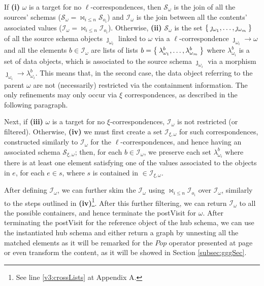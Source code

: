 \begin{example}[continues=ex:examplegraphdata,label=ex:examplereferencedOcaml]
{\narrower If \textbf{(i)} $\omega$ is a target for no $\ell$-correspondences, then $\mathcal{S}_\omega$ is the join of all the sources' schemas ($\mathcal{S}_\omega = \bowtie_{i\leq n} \mathcal{S}_{o_i}$) and $\mathcal{I}_\omega$ is the join between all the contents' associated values ($\mathcal{I}_\omega = \bowtie_{i\leq n}\mathcal{I}_{o_i}$). Otherwise, \textbf{(ii)}  $\mathcal{S}_\omega$ is the set $\Set{\jmath_{\omega_1},\dots,\jmath_{\omega_m}}$ of all the source schema objects $\jmath_{\omega_i}$ linked to $\omega$ via a $\ell$-correspondence $\jmath_{\omega_i}\to \omega$  and all the elements  $b\in \mathcal{I}_\omega$ are lists of lists $b=\Set{\lambda^b_{\omega_1},\dots,\lambda^b_{\omega_m}}$ where $\lambda^b_{\omega_i}$ is a set of data objects, which is associated to the source schema $\jmath_{\omega_i}$ via a morphism $\jmath_{\omega_i}\to \lambda^b_{\omega_i}$. This means that, in the second case, the data object referring to the parent $\omega$ are not (necessarily) restricted via the containment information. The only refinements may only occur via $\xi$ correspondences, as described in the following paragraph. \par}

{\narrower Next, if \textbf{(iii)} $\omega$ is a target for no $\xi$-correspondences, $\mathcal{I}_\omega$ is not restricted (or filtered). Otherwise, \textbf{(iv)} we must first create a set $\mathcal{I}_{\xi,\omega}$ for such correspondences, constructed similarly to $\mathcal{I}_\omega$ for the $\ell$-correspondences, and hence having an associated schema $\mathcal{S}_{\xi,\omega}$; then, for each $b\in \mathcal{I}_\omega$, we preserve each set $\lambda_{\omega_i}^b$ where there is at least one element satisfying one of the values associated to the objects in $e$, for each $e\in s$, where $s$ is contained in $\in\mathcal{I}_{\xi,\omega}$.\par}
\medskip

After defining $\mathcal{I}_\omega$, we can further skim the $\mathcal{I}_\omega$ using $\bowtie_{i\leq n}\mathcal{I}_{o_i}$ over $\mathcal{I}_\omega$, similarly to the steps outlined in \textbf{(iv)}\footnote{See line \vref{v3:crossLists} at Appendix A.}. After this further filtering, we can return $\mathcal{I}_\omega$ to all the possible containers, and hence terminate the postVisit for $\omega$. After terminating the postVisit for the reference object of the hub schema, we can use the instantiated hub schema and either return a graph by unnesting all the matched elements as it will be remarked for the $Pop$ operator presented at page \pageref{eq:popGraph} or even transform the content, as it will be showed in Section \vref{subsec:gggSec}. %


\end{example}
